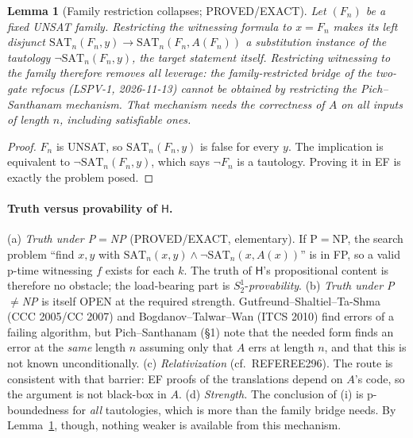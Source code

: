 \documentclass[11pt]{article}
\newtheorem{lemma}[theorem]{Lemma}
\theoremstyle{definition}
\newcommand{\SAT}{\mathrm{SAT}}
\begin{document}
\begin{lemma}[Family restriction collapses; PROVED/EXACT]\label{lem:collapse}
Let $(F_n)$ be a fixed UNSAT family. Restricting the witnessing formula to $x=F_n$ makes its
left disjunct $\SAT_n(F_n,y)\to\SAT_n(F_n,A(F_n))$ a substitution instance of the tautology
$\neg\SAT_n(F_n,y)$, the target statement itself. Restricting witnessing to the family
therefore removes all leverage: the family-restricted bridge of the two-gate refocus
(LSPV-1, 2026-11-13) \emph{cannot} be obtained by restricting the Pich--Santhanam mechanism.
That mechanism needs the correctness of $A$ on \emph{all} inputs of length $n$, including
satisfiable ones.
\end{lemma}
\begin{proof}
$F_n$ is UNSAT, so $\SAT_n(F_n,y)$ is false for every $y$. The implication is equivalent to
$\neg\SAT_n(F_n,y)$, which says $\neg F_n$ is a tautology. Proving it in EF is exactly the
problem posed.
\end{proof}

\paragraph{Truth versus provability of $\mathsf H$.}
(a) \emph{Truth under P$=$NP} (PROVED/EXACT, elementary). If P$=$NP, the search problem
``find $x,y$ with $\SAT_n(x,y)\wedge\neg\SAT_n(x,A(x))$'' is in FP, so a valid p-time
witnessing $f$ exists for each $k$. The truth of $\mathsf H$'s propositional content is
therefore no obstacle; the load-bearing part is $S^1_2$-\emph{provability}.
(b) \emph{Truth under P$\ne$NP} is itself OPEN at the required strength. Gutfreund--Shaltiel--Ta-Shma
(CCC 2005/CC 2007) and Bogdanov--Talwar--Wan (ITCS 2010) find errors of a failing algorithm,
but Pich--Santhanam (\S1) note that the needed form finds an error at the \emph{same} length
$n$ assuming only that $A$ errs at length $n$, and that this is not known unconditionally.
(c) \emph{Relativization} (cf.\ REFEREE296). The route is consistent with that barrier: EF
proofs of the translations depend on $A$'s code, so the argument is not black-box in $A$.
(d) \emph{Strength.} The conclusion of (i) is p-boundedness for \emph{all} tautologies, which
is more than the family bridge needs. By Lemma~\ref{lem:collapse}, though, nothing weaker is
available from this mechanism.
\end{document}
